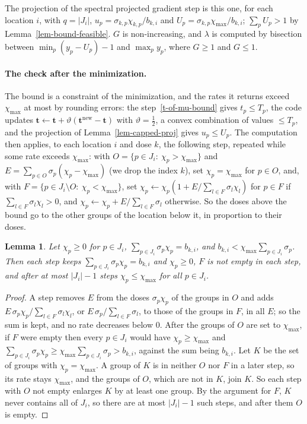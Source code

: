 \documentclass[11pt]{article}
\theoremstyle{plain}
\newtheorem{lemma}[theorem]{Lemma}
\theoremstyle{remark}
\numberwithin{equation}{section}
\begin{document}
The projection of the spectral projected gradient step is this one, for each location
$i$, with $q=|J_i|$, $u_p=\sigma_{k,p}\chi_{k,p}/b_{k,i}$ and
$U_p=\sigma_{k,p}\chi_{\max}/b_{k,i}$; $\sum_pU_p>1$ by
Lemma~\ref{lem-bound-feasible}. $G$ is non-increasing, and $\lambda$ is computed by
bisection between $\min_p(y_p-U_p)-1$ and $\max_py_p$, where $G\ge1$ and $G\le1$.

\paragraph{The check after the minimization.} The bound is a constraint of the
minimization, and the rates it returns exceed $\chi_{\max}$ at most by rounding
errors: the step~\eqref{t-of-mu-bound} gives $t_p\le T_p$, the code updates
$\bm t\leftarrow\bm t+\vartheta(\bm t^{\mathrm{new}}-\bm t)$ with $\vartheta=\frac12$, a convex
combination of values $\le T_p$, and the projection of
Lemma~\ref{lem-capped-proj} gives $u_p\le U_p$. The computation then applies, to each location $i$
and dose $k$, the following step, repeated while some rate exceeds $\chi_{\max}$:
with $O=\{p\in J_i:\ \chi_p>\chi_{\max}\}$ and
$E=\sum_{p\in O}\sigma_p(\chi_p-\chi_{\max})$ (we drop the index $k$), set
$\chi_p=\chi_{\max}$ for $p\in O$, and, with
$F=\{p\in J_i\setminus O:\ \chi_p<\chi_{\max}\}$, set
$\chi_p\leftarrow\chi_p\left(1+E/\sum_{l\in F}\sigma_l\chi_l\right)$ for $p\in F$
if $\sum_{l\in F}\sigma_l\chi_l>0$, and $\chi_p\leftarrow\chi_p+E/\sum_{l\in F}\sigma_l$
otherwise. So the doses above the bound go to the other groups of the location below
it, in proportion to their doses.

\begin{lemma}\label{lem-cap-check}
Let $\chi_p\ge0$ for $p\in J_i$, $\sum_{p\in J_i}\sigma_p\chi_p=b_{k,i}$, and
$b_{k,i}<\chi_{\max}\sum_{p\in J_i}\sigma_p$. Then each step keeps
$\sum_{p\in J_i}\sigma_p\chi_p=b_{k,i}$ and $\chi_p\ge0$, $F$ is not empty in each
step, and after at most $|J_i|-1$ steps $\chi_p\le\chi_{\max}$ for all $p\in J_i$.
\end{lemma}
\begin{proof}
A step removes $E$ from the doses $\sigma_p\chi_p$ of the groups in $O$ and adds
$E\,\sigma_p\chi_p/\sum_{l\in F}\sigma_l\chi_l$, or $E\,\sigma_p/\sum_{l\in F}\sigma_l$,
to those of the groups in $F$, in all $E$; so the sum is kept, and no rate decreases
below $0$. After the groups of $O$ are set to $\chi_{\max}$, if $F$ were empty then
every $p\in J_i$ would have $\chi_p\ge\chi_{\max}$ and
$\sum_{p\in J_i}\sigma_p\chi_p\ge\chi_{\max}\sum_{p\in J_i}\sigma_p>b_{k,i}$, against
the sum being $b_{k,i}$. Let $K$ be the set of groups with $\chi_p=\chi_{\max}$. A
group of $K$ is in neither $O$ nor $F$ in a later step, so its rate stays
$\chi_{\max}$, and the groups of $O$, which are not in $K$, join $K$. So each step
with $O$ not empty enlarges $K$ by at least one group. By the argument for $F$, $K$
never contains all of $J_i$, so there are at most $|J_i|-1$ such steps, and after them
$O$ is empty.
\end{proof}
\end{document}
